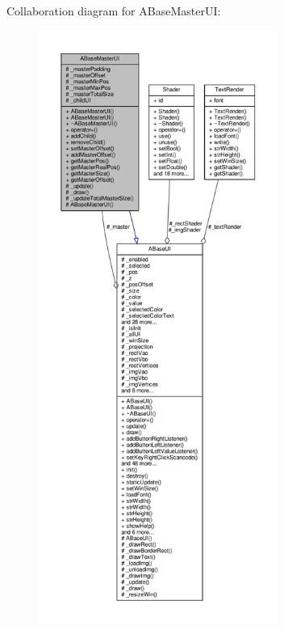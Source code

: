 Collaboration diagram for A\+Base\+Master\+UI\+:
\nopagebreak
\begin{figure}[H]
\begin{center}
\leavevmode
\includegraphics[height=550pt]{class_a_base_master_u_i__coll__graph}
\end{center}
\end{figure}

